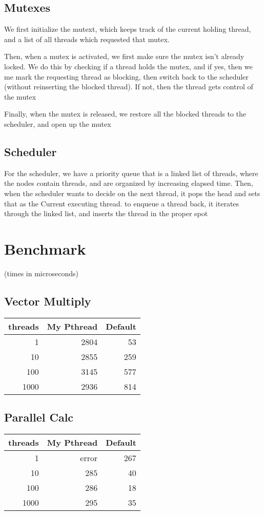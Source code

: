 \documentclass[11pt]{article}
\begin{document}
\subsection*{Mutexes}
\label{sec:orgf8c5a79}
We first initialize the mutext, which keeps track of the current holding thread, and a list of all threads which requested that mutex.

Then, when a mutex is activated, we first make sure the mutex isn't already locked. We do this by checking if a thread holds the mutex, and if yes, then we me mark the requesting thread as blocking, then switch back to the scheduler (without reinserting the blocked thread). If not, then the thread gets control of the mutex

Finally, when the mutex is released, we restore all the blocked threads to the scheduler, and open up the mutex
\subsection*{Scheduler}
\label{sec:org17186af}

For the scheduler, we have a priority queue that is a linked list of threads, where the nodes contain threads, and are organized by increasing elapsed time. Then, when the scheduler wants to decide on the next thread, it pops the head and sets that as the Current executing thread. to enqueue a thread back, it iterates through the linked list, and inserts the thread in the proper spot
\section*{Benchmark}
\label{sec:orgffd06a2}
(times in microseconds)
\subsection*{Vector Multiply}
\label{sec:org61e993f}
\begin{center}
\begin{tabular}{rrr}
threads & My Pthread & Default\\
\hline
1 & 2804 & 53\\
10 & 2855 & 259\\
100 & 3145 & 577\\
1000 & 2936 & 814\\
\end{tabular}
\end{center}

\subsection*{Parallel Calc}
\label{sec:orgca78c0d}
\begin{center}
\begin{tabular}{rrr}
threads & My Pthread & Default\\
\hline
1 & error & 267\\
10 & 285 & 40\\
100 & 286 & 18\\
1000 & 295 & 35\\
\end{tabular}
\end{center}
\end{document}
